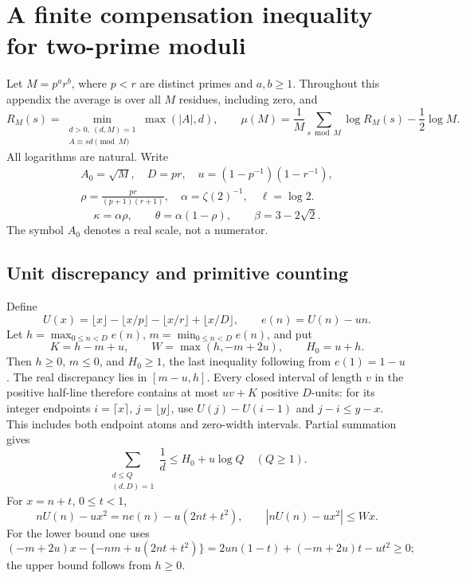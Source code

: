 \documentclass[11pt]{article}
\theoremstyle{definition}\newtheorem{definition}[theorem]{Definition}
\theoremstyle{remark}\newtheorem{remark}[theorem]{Remark}
\begin{document}
\appendix
\section{A finite compensation inequality for two-prime moduli}
\label{ap:two-prime-compensation}

Let \(M=p^a r^b\), where \(p<r\) are distinct primes and \(a,b\geq1\).
Throughout this appendix the average is over all \(M\) residues, including zero,
and
\[
 R_M(s)=\min_{\substack{d>0,\ (d,M)=1\\ A\equiv sd\pmod M}}
          \max(|A|,d),\qquad
 \mu(M)=\frac1M\sum_{s\bmod M}\log R_M(s)-\frac12\log M .
\]
All logarithms are natural. Write
\[
 \begin{gathered}
 A_0=\sqrt M,\quad D=pr,\quad u=(1-p^{-1})(1-r^{-1}),\\
 \rho=\frac{pr}{(p+1)(r+1)},\quad
 \alpha=\zeta(2)^{-1},\quad \ell=\log2.
 \end{gathered}
\]
\[
 \kappa=\alpha\rho,\qquad
 \theta=\alpha(1-\rho),\qquad \beta=3-2\sqrt2 .
\]
The symbol \(A_0\) denotes a real scale, not a numerator.

\subsection{Unit discrepancy and primitive counting}
\label{ap:unit-discrepancy}
Define
\[
 U(x)=\lfloor x\rfloor-\lfloor x/p\rfloor-\lfloor x/r\rfloor
                         +\lfloor x/D\rfloor,\qquad e(n)=U(n)-un.
\]
Let \(h=\max_{0\leq n<D}e(n)\), \(m=\min_{0\leq n<D}e(n)\), and put
\[
 K=h-m+u,\qquad W=\max(h,-m+2u),\qquad H_0=u+h.
\]
Then \(h\geq0\), \(m\leq0\), and \(H_0\geq1\), the last inequality following
from \(e(1)=1-u\). The real discrepancy lies in \([m-u,h]\).
Every closed interval of length \(v\) in the positive half-line therefore
contains at most \(uv+K\) positive \(D\)-units: for its integer endpoints
\(i=\lceil x\rceil\), \(j=\lfloor y\rfloor\), use
\(U(j)-U(i-1)\) and \(j-i\leq y-x\).
This includes both endpoint atoms and zero-width intervals.
Partial summation gives
\[
 \sum_{\substack{d\leq Q\\(d,D)=1}}\frac1d\leq H_0+u\log Q
 \quad(Q\geq1).
\]
For \(x=n+t\), \(0\leq t<1\),
\[
 nU(n)-ux^2=ne(n)-u(2nt+t^2),\qquad
 |nU(n)-ux^2|\leq Wx.
\]
For the lower bound one uses
\[
 (-m+2u)x-\{-nm+u(2nt+t^2)\}
 =2un(1-t)+(-m+2u)t-ut^2\geq0;
\]
the upper bound follows from \(h\geq0\).
\end{document}
